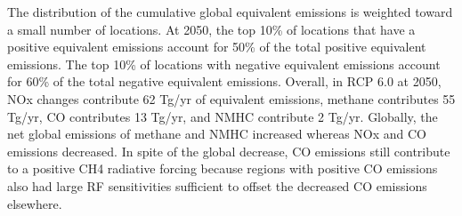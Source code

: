 The distribution of the cumulative global equivalent emissions is weighted toward a small number of locations. At 2050, the top 10\% of locations that have a positive equivalent emissions account for 50\% of the total positive equivalent emissions. The top 10\% of locations with negative equivalent emissions account for 60\% of the total negative equivalent emissions. Overall, in RCP 6.0 at 2050, NOx changes contribute 62 Tg/yr of equivalent emissions, methane contributes 55 Tg/yr, CO contributes 13 Tg/yr, and NMHC contribute 2 Tg/yr. Globally, the net global emissions of methane and NMHC increased whereas NOx and CO emissions decreased. In spite of the global decrease, CO emissions still contribute to a positive CH4 radiative forcing because regions with positive CO emissions also  had large RF sensitivities sufficient to offset the decreased CO emissions elsewhere.

